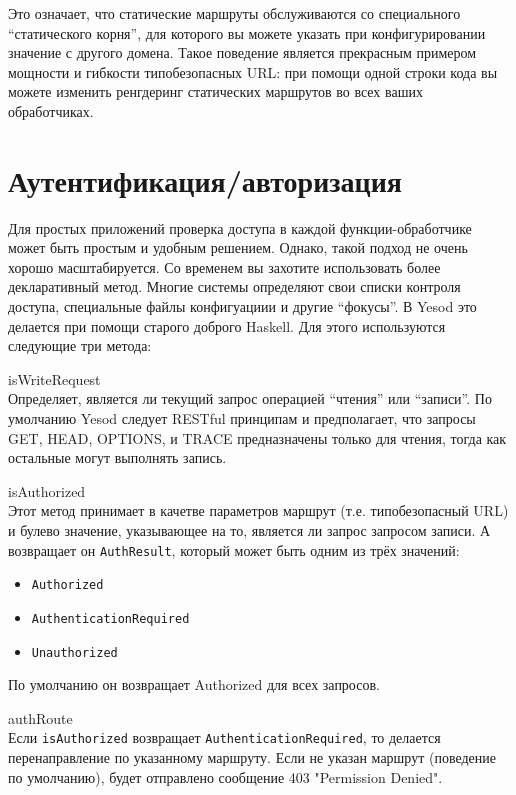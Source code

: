 Это означает, что статические маршруты обслуживаются со специального ``статического корня'', для которого вы можете указать при конфигурировании значение с другого домена. Такое поведение является прекрасным примером мощности и гибкости типобезопасных URL: при помощи одной строки кода вы можете изменить ренгдеринг статических маршрутов во всех ваших обработчиках.

\section {Аутентификация/авторизация}

Для простых приложений проверка доступа в каждой функции-обработчике может быть простым и удобным решением. Однако, такой подход не очень хорошо масштабируется. Со временем вы захотите использовать более декларативный метод. Многие системы определяют свои списки контроля доступа, специальные файлы конфигуациии и другие ``фокусы''. В Yesod это делается при помощи старого доброго Haskell. Для этого используются следующие три метода:

\begin{description}
  \item {isWriteRequest} \hfill \\
    Определяет, является ли текущий запрос операцией ``чтения'' или ``записи''. По умолчанию Yesod следует RESTful принципам и предполагает, что запросы GET, HEAD, OPTIONS, и TRACE предназначены только для чтения, тогда как остальные могут выполнять запись.

  \item {isAuthorized} \hfill \\

    Этот метод принимает в качетве параметров маршрут (т.е. типобезопасный URL) и булево значение, указывающее на то, является ли запрос запросом записи. А возвращает он \lstinline!AuthResult!, который может быть одним из трёх значений:

    \begin{itemize}
      \item \lstinline!Authorized!
      \item \lstinline!AuthenticationRequired!
      \item \lstinline!Unauthorized!
    \end{itemize}

    По умолчанию он возвращает Authorized для всех запросов.

  \item {authRoute} \hfill \\

    Если \lstinline!isAuthorized! возвращает \lstinline!AuthenticationRequired!, то делается перенаправление по указанному маршруту. Если не указан маршрут (поведение по умолчанию), будет отправлено сообщение 403 "Permission Denied".

\end{description}

